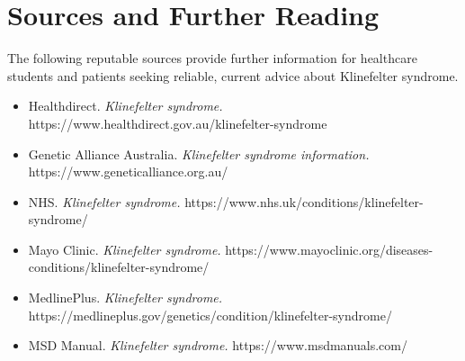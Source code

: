 \section*{Sources and Further Reading}
The following reputable sources provide further information for healthcare students and patients seeking reliable, current advice about Klinefelter syndrome.
\begin{itemize}
    \item Healthdirect. \textit{Klinefelter syndrome.} https://www.healthdirect.gov.au/klinefelter-syndrome
    \item Genetic Alliance Australia. \textit{Klinefelter syndrome information.} https://www.geneticalliance.org.au/
    \item NHS. \textit{Klinefelter syndrome.} https://www.nhs.uk/conditions/klinefelter-syndrome/
    \item Mayo Clinic. \textit{Klinefelter syndrome.} https://www.mayoclinic.org/diseases-conditions/klinefelter-syndrome/
    \item MedlinePlus. \textit{Klinefelter syndrome.} https://medlineplus.gov/genetics/condition/klinefelter-syndrome/
    \item MSD Manual. \textit{Klinefelter syndrome.} https://www.msdmanuals.com/
\end{itemize}
